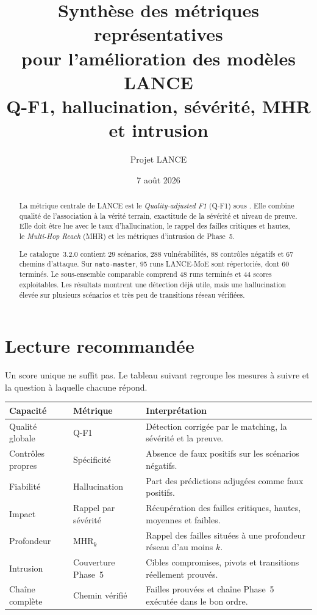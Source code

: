 \documentclass[11pt,a4paper]{article}
\title{\textbf{Synthèse des métriques représentatives\\
pour l'amélioration des modèles LANCE}\\[0.4em]
\large Q-F1, hallucination, sévérité, MHR et intrusion}
\author{Projet LANCE}
\date{7 août 2026}
\newcommand{\metric}[1]{\texttt{\detokenize{#1}}}
\begin{document}
\maketitle

\begin{abstract}
La métrique centrale de LANCE est le \emph{Quality-adjusted F1} (Q-F1) sous
\metric{strict-v3}. Elle combine qualité de l'association à la vérité terrain,
exactitude de la sévérité et niveau de preuve. Elle doit être lue avec le taux
d'hallucination, le rappel des failles critiques et hautes, le
\emph{Multi-Hop Reach} (MHR) et les métriques d'intrusion de Phase~5.

Le catalogue~3.2.0 contient 29 scénarios, 288 vulnérabilités, 88 contrôles
négatifs et 67 chemins d'attaque. Sur \texttt{nato-master}, 95 runs LANCE-MoE
sont répertoriés, dont 60 terminés. Le sous-ensemble comparable
\metric{compact} comprend 48 runs terminés et 44 scores exploitables. Les
résultats montrent une détection déjà utile, mais une hallucination élevée sur
plusieurs scénarios et très peu de transitions réseau vérifiées.
\end{abstract}

\section{Lecture recommandée}

Un score unique ne suffit pas. Le tableau suivant regroupe les mesures à suivre
et la question à laquelle chacune répond.

\begin{center}
\begin{tabularx}{\textwidth}{@{}p{3.2cm}XX@{}}
\toprule
Capacité & Métrique & Interprétation \\
\midrule
Qualité globale & Q-F1 & Détection corrigée par le matching, la sévérité et la preuve. \\
Contrôles propres & Spécificité & Absence de faux positifs sur les scénarios négatifs. \\
Fiabilité & Hallucination & Part des prédictions adjugées comme faux positifs. \\
Impact & Rappel par sévérité & Récupération des failles critiques, hautes, moyennes et faibles. \\
Profondeur & $\mathrm{MHR}_k$ & Rappel des failles situées à une profondeur réseau d'au moins $k$. \\
Intrusion & Couverture Phase~5 & Cibles compromises, pivots et transitions réellement prouvés. \\
Chaîne complète & Chemin vérifié & Failles prouvées et chaîne Phase~5 exécutée dans le bon ordre. \\
\bottomrule
\end{tabularx}
\end{center}
\end{document}
